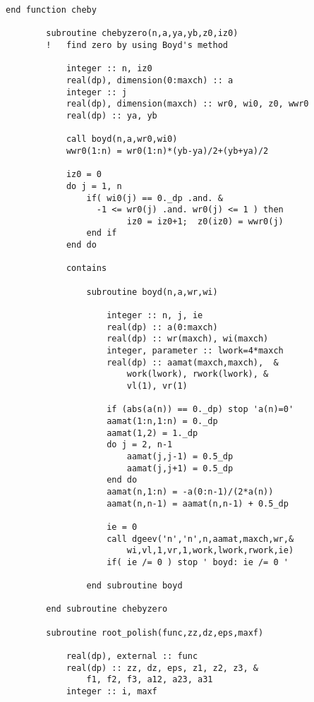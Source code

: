 \documentclass[12pt]{article}
\begin{document}
\begin{lstlisting}[frame=single,caption={{\tt cheby.f90}},label=cheby]
        end function cheby
                
        subroutine chebyzero(n,a,ya,yb,z0,iz0) 
        !   find zero by using Boyd's method
        
            integer :: n, iz0
            real(dp), dimension(0:maxch) :: a
            integer :: j
            real(dp), dimension(maxch) :: wr0, wi0, z0, wwr0
            real(dp) :: ya, yb
            
            call boyd(n,a,wr0,wi0)
            wwr0(1:n) = wr0(1:n)*(yb-ya)/2+(yb+ya)/2
            
            iz0 = 0
            do j = 1, n
                if( wi0(j) == 0._dp .and. &
                  -1 <= wr0(j) .and. wr0(j) <= 1 ) then 
                        iz0 = iz0+1;  z0(iz0) = wwr0(j)
                end if
            end do
                        
            contains
                
                subroutine boyd(n,a,wr,wi)
                
                    integer :: n, j, ie
                    real(dp) :: a(0:maxch)
                    real(dp) :: wr(maxch), wi(maxch)
                    integer, parameter :: lwork=4*maxch
                    real(dp) :: aamat(maxch,maxch),  &
                        work(lwork), rwork(lwork), &
                        vl(1), vr(1)
                    
                    if (abs(a(n)) == 0._dp) stop 'a(n)=0'
                    aamat(1:n,1:n) = 0._dp
                    aamat(1,2) = 1._dp
                    do j = 2, n-1
                        aamat(j,j-1) = 0.5_dp
                        aamat(j,j+1) = 0.5_dp
                    end do
                    aamat(n,1:n) = -a(0:n-1)/(2*a(n))
                    aamat(n,n-1) = aamat(n,n-1) + 0.5_dp
                    
                    ie = 0
                    call dgeev('n','n',n,aamat,maxch,wr,&
                        wi,vl,1,vr,1,work,lwork,rwork,ie)                      
                    if( ie /= 0 ) stop ' boyd: ie /= 0 ' 
                            
                end subroutine boyd
                
        end subroutine chebyzero
        
        subroutine root_polish(func,zz,dz,eps,maxf)
        
            real(dp), external :: func
            real(dp) :: zz, dz, eps, z1, z2, z3, &
                f1, f2, f3, a12, a23, a31
            integer :: i, maxf
            

\end{lstlisting}
\end{document}
